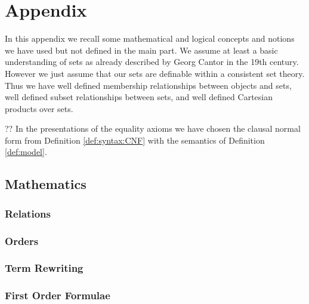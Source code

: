 

\chapter{Appendix}



In this appendix we recall some mathematical and logical concepts and notions 
we have used but not defined in the main part.
We assume at least a {\myem basic} understanding of sets as already 
described by Georg Cantor in the 19th century. 
However we just assume that our sets are definable within a consistent set theory.
Thus we have well defined {\myem membership} relationships between objects and sets,
well defined {\myem subset} relationships between sets, 
and well defined {\myem Cartesian products} over sets.

?? In the presentations of the equality axioms we have chosen the clausal normal form 
from Definition \vref{def:syntax:CNF} 
with the semantics of Definition \vref{def:model}.

\section{Mathematics}\label{sec:app:mathematics}

\subsection{Relations}



\subsection{Orders}\label{sec:app:orders}



\subsection{Term Rewriting}



\subsection{First Order Formulae}



